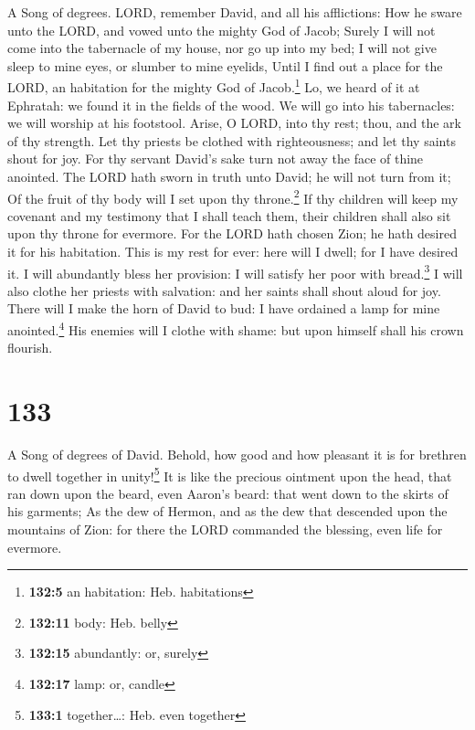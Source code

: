 A Song of degrees.  LORD, remember David, and all his
afflictions:  How he sware unto the LORD, and vowed unto
the mighty God of Jacob;  Surely I will not come into the
tabernacle of my house, nor go up into my bed;  I will not
give sleep to mine eyes, or slumber to mine eyelids, 
Until I find out a place for the LORD, an habitation for the mighty God
of Jacob.\footnote{\textbf{132:5} an habitation: Heb. habitations}
 Lo, we heard of it at Ephratah: we found it in the fields
of the wood.  We will go into his tabernacles: we will
worship at his footstool.  Arise, O LORD, into thy rest;
thou, and the ark of thy strength.  Let thy priests be
clothed with righteousness; and let thy saints shout for joy.
 For thy servant David's sake turn not away the face of
thine anointed.  The LORD hath sworn in truth unto David;
he will not turn from it; Of the fruit of thy body will I set upon thy
throne.\footnote{\textbf{132:11} body: Heb. belly}  If
thy children will keep my covenant and my testimony that I shall teach
them, their children shall also sit upon thy throne for evermore.
 For the LORD hath chosen Zion; he hath desired it for
his habitation.  This is my rest for ever: here will I
dwell; for I have desired it.  I will abundantly bless
her provision: I will satisfy her poor with bread.\footnote{\textbf{132:15}
  abundantly: or, surely}  I will also clothe her priests
with salvation: and her saints shall shout aloud for joy.
 There will I make the horn of David to bud: I have
ordained a lamp for mine anointed.\footnote{\textbf{132:17} lamp: or,
  candle}  His enemies will I clothe with shame: but upon
himself shall his crown flourish.

\hypertarget{section-134}{%
\section{133}\label{section-134}}

A Song of degrees of David.  Behold, how good and how
pleasant it is for brethren to dwell together in unity!\footnote{\textbf{133:1}
  together\ldots: Heb. even together}  It is like the
precious ointment upon the head, that ran down upon the beard, even
Aaron's beard: that went down to the skirts of his garments;
 As the dew of Hermon, and as the dew that descended upon
the mountains of Zion: for there the LORD commanded the blessing, even
life for evermore.

